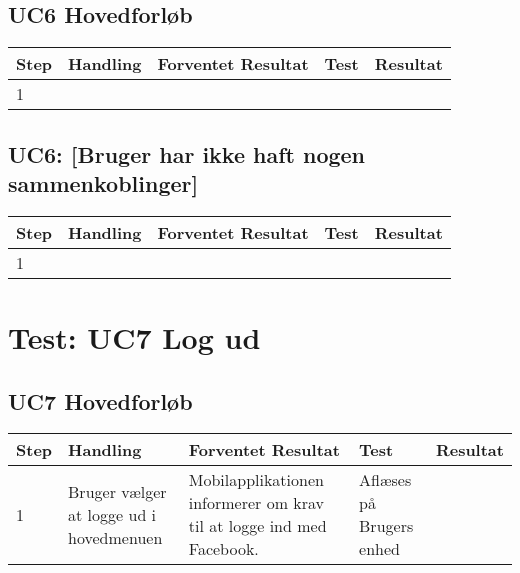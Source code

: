 \subsection{UC6 Hovedforløb}

\begin{longtable}{| p{0.7cm}  | p{3cm}  | p{4cm} |  p{3cm}  | p{3cm}  |}
\hline
Step & Handling & Forventet Resultat & Test & Resultat \\
\hline
1 & &  & & \FuckingHuge{\textdiv}  \\
\hline
\end{longtable}

\subsection{UC6: [Bruger har ikke haft nogen sammenkoblinger]}

\begin{longtable}{| p{0.7cm}  | p{3cm}  | p{4cm} |  p{3cm}  | p{3cm}  |}
\hline
Step & Handling & Forventet Resultat & Test & Resultat \\
\hline
1 &  & &  & \FuckingHuge{\textdiv} \\
\hline
\end{longtable}


\newpage

\section{Test: UC7 Log ud}

\subsection{UC7 Hovedforløb}

\begin{longtable}{| p{0.7cm}  | p{3cm}  | p{4cm} |  p{3cm}  | p{3cm}  |}
\hline
Step & Handling & Forventet Resultat & Test & Resultat \\
\hline
1 &  Bruger vælger at logge ud i hovedmenuen &    Mobilapplikationen informerer om krav til at logge ind med Facebook. & Aflæses på Brugers enhed & \FuckingHuge{\checkmark} \\
\hline
\end{longtable}


